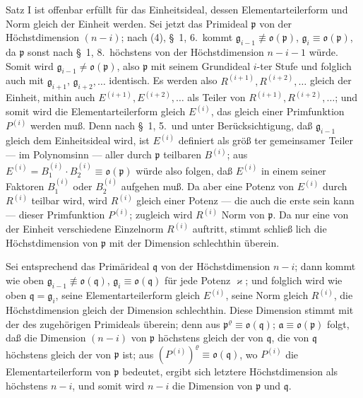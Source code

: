 \documentclass[12pt,a4paper]{article}
\begin{document}
{{Satz I ist offenbar erf\"{u}llt f\"{u}r das Einheitsideal, dessen Elementarteilerform
und Norm gleich der Einheit werden. Sei jetzt das Primideal $\mathfrak{p}$
von der H\"{o}chstdimension $(n-i)$; nach (4), \S~1, 6.\ kommt
$\mathfrak{g}_{i-1}\not\equiv\mathfrak{o}(\mathfrak{p})$, $\mathfrak{g}_{i}\equiv\mathfrak{o}(\mathfrak{p})$,
da $\mathfrak{p}$ sonst nach \S~1, 8.\ h\"{o}chstens von der H\"{o}chstdimension $n-i-1$
w\"{u}rde. Somit wird $\mathfrak{g}_{i-1}\neq\mathfrak{o}(\mathfrak{p})$, also $\mathfrak{p}$ mit seinem Grundideal $i$-ter Stufe
und folglich auch mit $\mathfrak{g}_{i+1}$, $\mathfrak{g}_{i+2},\dots$ identisch. Es werden also
$R^{(i+1)},R^{(i+2)},\dots$ gleich der Einheit, mithin auch $E^{(i+1)},E^{(i+2)},\dots$
als Teiler von $R^{(i+1)},R^{(i+2)},\dots$; und somit wird die Elementarteilerform
gleich $E^{(i)}$, das gleich einer Primfunktion $P^{(i)}$ werden mu{\ss}. Denn nach
\S~1, 5.\ und unter Ber\"{u}cksichtigung, da{\ss} $\mathfrak{g}_{i-1}$ gleich dem Einheitsideal
wird, ist $E^{(i)}$ definiert als gr\"{o}{\ss} ter gemeinsamer Teiler --- im Polynomsinn
--- aller durch $\mathfrak{p}$ teilbaren $B^{(i)}$; aus $E^{(i)}=B_{1}^{(i)}\cdot B_{2}^{(i)}\equiv\mathfrak{o}(\mathfrak{p})$
w\"{u}rde also folgen, da{\ss} $E^{(i)}$ in einem seiner Faktoren $B_{1}^{(i)}$ oder $B_{2}^{(i)}$
aufgehen mu{\ss}. Da aber eine Potenz von $E^{(i)}$ durch $R^{(i)}$ teilbar wird,
wird $R^{(i)}$ gleich einer Potenz --- die auch die erste sein kann --- dieser
Primfunktion $P^{(i)}$; zugleich wird $R^{(i)}$ Norm von $\mathfrak{p}$. Da nur eine von
der Einheit verschiedene Einzelnorm $R^{(i)}$ auftritt, stimmt schlie{\ss} lich
die H\"{o}chstdimension von $\mathfrak{p}$ mit der Dimension schlechthin \"{u}berein.

Sei entsprechend das Prim\"{a}rideal $\mathfrak{q}$ von der H\"{o}chstdimension $n-i$;
dann kommt wie oben $\mathfrak{g}_{i-1}\not\equiv\mathfrak{o}(\mathfrak{q})$, $\mathfrak{g}_{i}\equiv\mathfrak{o}(\mathfrak{q})$
f\"{u}r jede Potenz $\varkappa$; und folglich wird wie oben $\mathfrak{q}=\mathfrak{g}_{i}$, seine Elementarteilerform
gleich $E^{(i)}$, seine Norm gleich $R^{(i)}$, die H\"{o}chstdimension gleich
der Dimension schlechthin. Diese Dimension stimmt mit der des zugeh\"{o}rigen
Primideals \"{u}berein; denn aus $\mathfrak{p}^{\varrho}\equiv\mathfrak{o}(\mathfrak{q})$; $\mathfrak{a}\equiv\mathfrak{o}(\mathfrak{p})$ folgt, da{\ss{}}
die Dimension $(n-i)$ von $\mathfrak{p}$ h\"{o}chstens gleich der von $\mathfrak{q}$, die von $\mathfrak{q}$ h\"{o}chstens
gleich der von $\mathfrak{p}$ ist; aus $(P^{(i)})^{\varrho}\equiv\mathfrak{o}(\mathfrak{q})$, wo $P^{(i)}$ die Elementarteilerform
von $\mathfrak{p}$ bedeutet, ergibt sich letztere H\"{o}chstdimension als h\"{o}chstens
$n-i$, und somit wird $n-i$ die Dimension von $\mathfrak{p}$ und $\mathfrak{q}$.

}}
\end{document}
